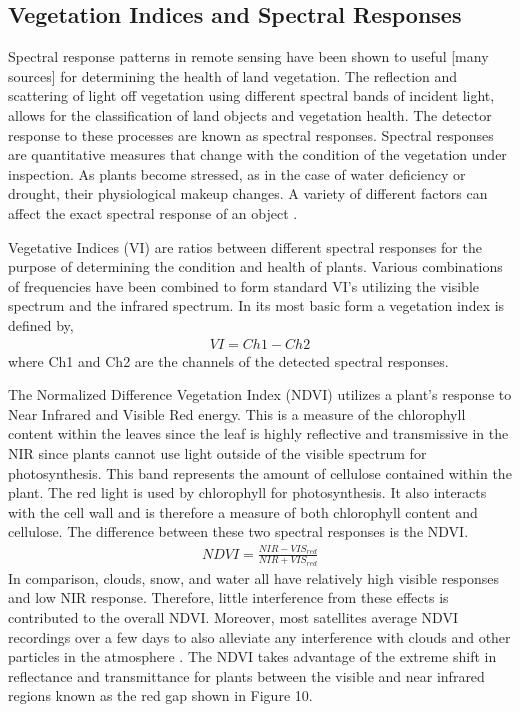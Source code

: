 \subsection{Vegetation Indices and Spectral Responses}
Spectral response patterns in remote sensing have been shown to useful [many sources] for determining the health of land vegetation.  The reflection and scattering of light off vegetation using different spectral bands of incident light, allows for the classification of land objects and vegetation health.  The detector response to these processes are known as spectral responses.  Spectral responses are quantitative measures that change with the condition of the vegetation under inspection.  As plants become stressed, as in the case of water deficiency or drought, their physiological makeup changes.  A variety of different factors can affect the exact spectral response of an object \cite{remotesensing}.

Vegetative Indices (VI) are ratios between different spectral responses for the purpose of determining the condition and health of plants.  Various combinations of frequencies have been combined to form standard VI’s utilizing the visible spectrum and the infrared spectrum. In its most basic form a vegetation index is defined by,
%
\begin{align}
    VI = Ch1 - Ch2
\end{align}
%
where Ch1 and Ch2 are the channels of the detected spectral responses.

The Normalized Difference Vegetation Index (NDVI) utilizes a plant's response to Near Infrared and Visible Red energy.  This is a measure of the chlorophyll content within the leaves since the leaf is highly reflective and transmissive in the NIR since plants cannot use light outside of the visible spectrum for photosynthesis.  This band represents the amount of cellulose contained within the plant.  The red light is used by chlorophyll for photosynthesis.  It also interacts with the cell wall and is therefore a measure of both chlorophyll content and cellulose.  The difference between these two spectral responses is the NDVI.
%
\begin{align}
    NDVI = \frac{NIR - VIS_{red}}{NIR + VIS_{red}}
\end{align}
%
In comparison, clouds, snow, and water all have relatively high visible responses and low NIR response.  Therefore, little interference from these effects is contributed to the overall NDVI.  Moreover, most satellites average NDVI recordings over a few days to also alleviate any interference with clouds and other particles in the atmosphere \cite{remotesensing}.
The NDVI takes advantage of the extreme shift in reflectance and transmittance for plants between the visible and near infrared regions known as the red gap shown in Figure 10.

